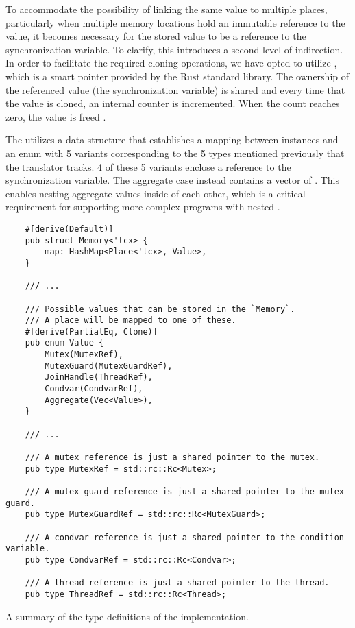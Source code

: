 To accommodate the possibility of linking the same value to multiple places,
particularly when multiple memory locations hold an immutable reference to the value,
it becomes necessary for the stored value to be a reference to the synchronization variable.
To clarify, this introduces a second level of indirection.
In order to facilitate the required cloning operations,
we have opted to utilize ,
which is a smart pointer provided by the Rust standard library.
The ownership of the referenced value (the synchronization variable) is shared
and every time that the value is cloned, an internal counter is incremented.
When the count reaches zero, the value is freed \cite[Chap. 15.4]{rust-book}.

The  utilizes a  data structure
that establishes a mapping between  instances and
an enum with 5 variants corresponding to
the 5 types mentioned previously that the translator tracks.
4 of these 5 variants enclose a 
reference to the synchronization variable.
The aggregate case instead contains a vector of .
This enables nesting aggregate values inside of each other,
which is a critical requirement for supporting more complex programs with nested .

\begin{listing}[!htb]
  \begin{verbatim}
    #[derive(Default)]
    pub struct Memory<'tcx> {
        map: HashMap<Place<'tcx>, Value>,
    }

    /// ...

    /// Possible values that can be stored in the `Memory`.
    /// A place will be mapped to one of these.
    #[derive(PartialEq, Clone)]
    pub enum Value {
        Mutex(MutexRef),
        MutexGuard(MutexGuardRef),
        JoinHandle(ThreadRef),
        Condvar(CondvarRef),
        Aggregate(Vec<Value>),
    }

    /// ...
    
    /// A mutex reference is just a shared pointer to the mutex.
    pub type MutexRef = std::rc::Rc<Mutex>;

    /// A mutex guard reference is just a shared pointer to the mutex guard.
    pub type MutexGuardRef = std::rc::Rc<MutexGuard>;

    /// A condvar reference is just a shared pointer to the condition variable.
    pub type CondvarRef = std::rc::Rc<Condvar>;

    /// A thread reference is just a shared pointer to the thread.
    pub type ThreadRef = std::rc::Rc<Thread>;
  \end{verbatim}
  \caption{A summary of the type definitions of the  implementation.}
  \label{lst:memory-implementation}
\end{listing}

